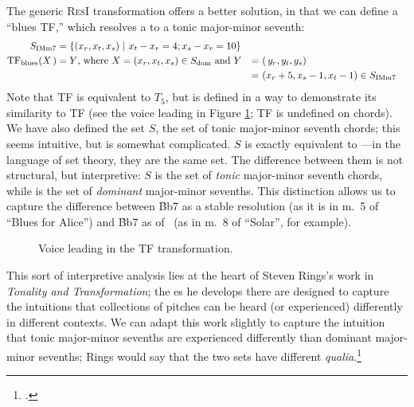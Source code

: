 The generic \textsc{ResI} transformation offers a better solution, in that we
can define a ``blues TF,'' which resolves a \V to a tonic major-minor
seventh:%
%
\begin{alignat*}{2}
  S_{\mathrm{IMm7}} &= \{ (x_r, x_t, x_s)\ |\ x_t - x_r = 4; x_s - x_r = 10 \} & \\
  \mathrm{TF}_{\mathrm{blues}}(X\,) &= Y\text{, where}\ X = (x_r, x_t, x_s)
    \in S_{\mathrm{dom}} \text{ and}\ Y &=&\ (\,y_r, y_t, y_s) \\
     &                     &=&\ (x_r+5, x_s-1, x_t-1) \in S_{\mathrm{IMm7}}
\end{alignat*}
%
Note that TF is equivalent to $T_5$, but is defined in a way to
demonstrate its similarity to TF (see the voice leading in Figure
\ref{tfe:tf-blues-voice-leading}; TF is undefined on \ii
chords). We have also defined the set $S$, the set of tonic
major-minor seventh chords; this seems intuitive, but is somewhat
complicated. $S$ is exactly equivalent to \Sdom---in the language
of set theory, they are the same set. The difference between them is
not structural, but interpretive: $S$ is the set of \emph{tonic}
major-minor seventh chords, while \Sdom is the set of \emph{dominant}
major-minor sevenths. This distinction allows us to capture the difference
between \h{Bb7} as a stable resolution (as it is in m.~5 of ``Blues for
Alice'') and \h{Bb7} as \V of \Eflat\ (as in m.~8 of ``Solar'', for
example).

\begin{figure}[tbp]
  \caption{Voice leading in the TF transformation.}
  \label{tfe:tf-blues-voice-leading}
\end{figure}

This sort of interpretive analysis lies at the heart of Steven Rings's work in
\emph{Tonality and Transformation}; the \gis{}es he develops there are
designed to capture the intuitions that collections of pitches can be
heard (or experienced) differently in different contexts. We can adapt this
work slightly to capture the intuition that tonic major-minor sevenths are
experienced differently than dominant major-minor sevenths; Rings would say
that the two sets have different \emph{qualia}.\footcite[41--43 (and
throughout)]{rings:2011}

